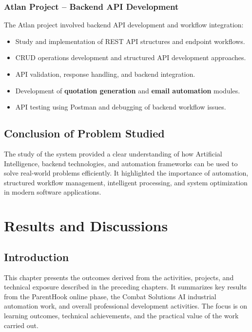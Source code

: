 \documentclass[12pt,a4paper]{report}
\begin{document}
\subsection{Atlan Project -- Backend API Development}

The Atlan project involved backend API development and workflow integration:
\begin{itemize}[leftmargin=1.5cm]
    \item Study and implementation of REST API structures and endpoint workflows.
    \item CRUD operations development and structured API development approaches.
    \item API validation, response handling, and backend integration.
    \item Development of \textbf{quotation generation} and \textbf{email automation} modules.
    \item API testing using Postman and debugging of backend workflow issues.
\end{itemize}

\section{Conclusion of Problem Studied}

The study of the system provided a clear understanding of how Artificial Intelligence, backend technologies, and automation frameworks can be used to solve real-world problems efficiently. It highlighted the importance of automation, structured workflow management, intelligent processing, and system optimization in modern software applications.

\chapter{Results and Discussions}

\section{Introduction}

This chapter presents the outcomes derived from the activities, projects, and technical exposure described in the preceding chapters. It summarizes key results from the ParentHook online phase, the Combat Solutions AI industrial automation work, and overall professional development activities. The focus is on learning outcomes, technical achievements, and the practical value of the work carried out.
\end{document}
